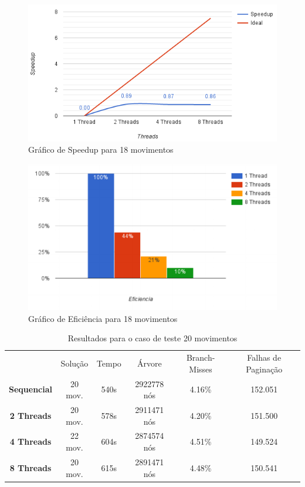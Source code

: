 \documentclass[12pt]{article}
\begin{document}
\begin{figure}[!ht]
\centering
\includegraphics[width=1\textwidth]{speedup18.png}
\caption{Gráfico de Speedup para 18 movimentos}
\label{fig:figura3}
\end{figure}

\begin{figure}[!ht]
\centering
\includegraphics[width=1\textwidth]{efic18.png}
\caption{Gráfico de Eficiência para 18 movimentos}
\label{fig:figura4}
\end{figure}

\begin{table}[!ht]
\centering
\caption{Resultados para o caso de teste 20 movimentos}
\label{tabela2}
\begin{tabular}{cccccc}
                    & Solução & Tempo & Árvore & Branch-Misses & Falhas de Paginação \\
\textbf{Sequencial} & 20 mov.          & 540s           & 2922778 nós     & 4.16\%                 & 152.051                      \\
\textbf{2 Threads}  & 20 mov.          & 578s           & 2911471 nós     & 4.20\%                 & 151.500                      \\
\textbf{4 Threads}  & 22 mov.          & 604s           & 2874574 nós     & 4.51\%                 & 149.524                      \\
\textbf{8 Threads}  & 20 mov.          & 615s           & 2891471 nós     & 4.48\%                 & 150.541                     
\end{tabular}
\end{table}
\end{document}
